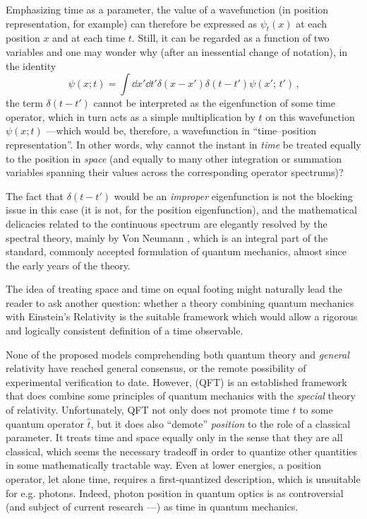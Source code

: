Emphasizing time as a parameter, the value of a wavefunction
(in position representation, for example)
can therefore be expressed as $\psi_{t}(x)$ at each position $x$
and at each time $t$.
Still, it can be regarded as a function of two variables
and one may wonder why (after an inessential change of notation),
in the identity
\begin{equation}\label{eq:diracdeltaxt}
  \psi(x; t) = \int \dd{x'}\dd{t'} \delta(x-x')\delta(t-t') \psi(x';\, t') \,\text{,}
\end{equation}
the term $\delta(t-t')$ cannot be interpreted as the eigenfunction of some time operator,
which in turn acts as a simple multiplication by $t$ on this
wavefunction $\psi(x; t)$ ---which would be, therefore, a wavefunction in ``time--position representation''.
In other words, why cannot the instant in \emph{time}
be treated equally
to the position in \emph{space}
(and equally to many other integration or summation variables spanning
their values
across the
corresponding operator spectrums)?

The fact that $\delta(t-t')$ would be an \emph{improper} eigenfunction
is not the blocking issue in this case (it is not, for the position eigenfunction),
and the mathematical delicacies related to the continuous spectrum are
elegantly resolved by the spectral theory, mainly by Von Neumann
\parencite{VonNeumann}, which is an integral part of the standard, commonly accepted
formulation of quantum mechanics, almost since the early years of the theory.

The idea of treating space and time on equal footing might naturally lead the reader to
ask another question: whether a theory combining quantum mechanics with Einstein's
Relativity is the suitable framework which would allow a rigorous and logically consistent
definition of a time observable.

None of the proposed models comprehending both quantum theory and \emph{general} relativity
have reached general consensus,
or the remote possibility of experimental verification to date.
However,  (QFT) is an established framework that does combine
some principles
of quantum mechanics with the \emph{special} theory of relativity.
Unfortunately, QFT not only does not promote time $t$ to some quantum operator $\hat{t}$,
but it does also ``demote'' \emph{position} to the role of a classical parameter.
It treats time and space equally only in the sense that they are all classical,
which seems the necessary tradeoff in order to quantize other quantities
in some mathematically tractable way. Even at lower energies,
a position operator, let alone time, requires a first-quantized description,
which is unsuitable for e.g. photons.
Indeed, photon position in quantum optics is as controversial
(and subject of current research ---\cite{HawtonPhotonPosition, Hawton2019})
as time in quantum mechanics.
